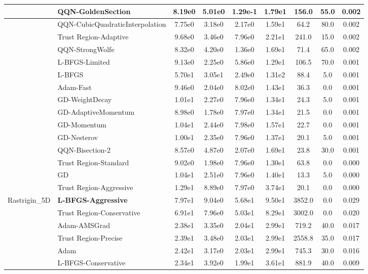 \documentclass[10pt]{article}
\begin{document}
\begin{longtable}{|l|l|c|c|c|c|c|c|c|}
 & QQN-GoldenSection & 8.19e0 & 5.01e0 & 1.29e-1 & 1.79e1 & 156.0 & 55.0 & 0.002 \\
\hline
 & QQN-CubicQuadraticInterpolation & 7.75e0 & 3.18e0 & 2.17e0 & 1.59e1 & 64.2 & 80.0 & 0.002 \\
\hline
 & Trust Region-Adaptive & 9.68e0 & 3.46e0 & 7.96e0 & 2.21e1 & 241.0 & 15.0 & 0.002 \\
\hline
 & QQN-StrongWolfe & 8.32e0 & 4.20e0 & 1.36e0 & 1.69e1 & 71.4 & 65.0 & 0.002 \\
\hline
 & L-BFGS-Limited & 9.13e0 & 2.25e0 & 5.86e0 & 1.29e1 & 106.5 & 70.0 & 0.001 \\
\hline
 & L-BFGS & 5.70e1 & 3.05e1 & 2.49e0 & 1.31e2 & 88.4 & 5.0 & 0.001 \\
\hline
 & Adam-Fast & 9.46e0 & 2.04e0 & 8.02e0 & 1.43e1 & 36.3 & 0.0 & 0.001 \\
\hline
 & GD-WeightDecay & 1.01e1 & 2.27e0 & 7.96e0 & 1.34e1 & 24.3 & 5.0 & 0.001 \\
\hline
 & GD-AdaptiveMomentum & 8.98e0 & 1.78e0 & 7.97e0 & 1.34e1 & 21.5 & 0.0 & 0.001 \\
\hline
 & GD-Momentum & 1.04e1 & 2.44e0 & 7.98e0 & 1.57e1 & 22.7 & 0.0 & 0.001 \\
\hline
 & GD-Nesterov & 1.00e1 & 2.35e0 & 7.96e0 & 1.37e1 & 20.1 & 5.0 & 0.001 \\
\hline
 & QQN-Bisection-2 & 8.57e0 & 4.87e0 & 2.07e0 & 1.69e1 & 23.8 & 30.0 & 0.001 \\
\hline
 & Trust Region-Standard & 9.02e0 & 1.98e0 & 7.96e0 & 1.30e1 & 63.8 & 0.0 & 0.000 \\
\hline
 & GD & 1.04e1 & 2.51e0 & 7.96e0 & 1.40e1 & 13.3 & 5.0 & 0.000 \\
\hline
 & Trust Region-Aggressive & 1.29e1 & 8.89e0 & 7.97e0 & 3.74e1 & 20.1 & 0.0 & 0.000 \\
Rastrigin\_5D & \textbf{L-BFGS-Aggressive} & 7.97e1 & 9.04e0 & 5.68e1 & 9.50e1 & 3852.0 & 0.0 & 0.029 \\
\hline
 & Trust Region-Conservative & 6.91e1 & 7.96e0 & 5.03e1 & 8.29e1 & 3002.0 & 0.0 & 0.020 \\
\hline
 & Adam-AMSGrad & 2.38e1 & 3.35e0 & 2.04e1 & 2.99e1 & 719.2 & 40.0 & 0.017 \\
\hline
 & Trust Region-Precise & 2.39e1 & 3.48e0 & 2.03e1 & 2.99e1 & 2558.8 & 35.0 & 0.017 \\
\hline
 & Adam & 2.42e1 & 3.17e0 & 2.03e1 & 2.99e1 & 745.3 & 30.0 & 0.016 \\
\hline
 & L-BFGS-Conservative & 2.34e1 & 3.92e0 & 1.99e1 & 3.61e1 & 881.9 & 40.0 & 0.009 \\

\end{longtable}
\end{document}
